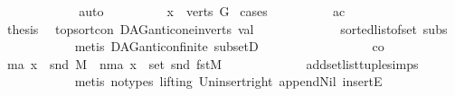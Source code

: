 \begin{isabellebody}
\ \ \ \ \ \ \ \ \isamarkupfalse%
\ {}\ \isamarkupfalse%
\ auto\isanewline
\ \ \ \ \ \ \isamarkupfalse%
\ \isamarkupfalse%
\ {\isachardoublequoteopen}x\ {\isasymin}\ verts\ G{\isachardoublequoteclose}\ \isamarkupfalse%
{\isacharparenleft}{\kern0pt}cases{\isacharparenright}{\kern0pt}\isanewline
\ \ \ \ \ \ \ \ \isamarkupfalse%
\ ac\isanewline
\ \ \ \ \ \ \ \ \isamarkupfalse%
\ \isamarkupfalse%
\ {\isacharquery}{\kern0pt}thesis\ \isamarkupfalse%
\ top{\isacharunderscore}{\kern0pt}sort{\isacharunderscore}{\kern0pt}con\ DAG{\isachardot}{\kern0pt}anticone{\isacharunderscore}{\kern0pt}in{\isacharunderscore}{\kern0pt}verts\ val\ \isanewline
\ \ \ \ \ \ \ \ \ \ \ \ sorted{\isacharunderscore}{\kern0pt}list{\isacharunderscore}{\kern0pt}of{\isacharunderscore}{\kern0pt}set{\isacharparenleft}{\kern0pt}{}{\isacharparenright}{\kern0pt}\ subs{\isacharparenleft}{\kern0pt}{}{\isacharparenright}{\kern0pt}\isanewline
\ \ \ \ \ \ \ \ \ \ \isamarkupfalse%
\ {\isacharparenleft}{\kern0pt}metis\ DAG{\isachardot}{\kern0pt}anticon{\isacharunderscore}{\kern0pt}finite\ subsetD{\isacharparenright}{\kern0pt}\ \isanewline
\ \ \ \ \ \ \isamarkupfalse%
\isanewline
\ \ \ \ \ \ \ \ \isamarkupfalse%
\ co\isanewline
\ \ \ \ \ \ \ \ \isamarkupfalse%
\ \isamarkupfalse%
\ {\isacharparenleft}{\kern0pt}ma{\isacharparenright}{\kern0pt}\ {\isachardoublequoteopen}x\ {\isacharequal}{\kern0pt}\ snd\ M{\isachardoublequoteclose}\ {\isacharbar}{\kern0pt}\ {\isacharparenleft}{\kern0pt}nma{\isacharparenright}{\kern0pt}\ {\isachardoublequoteopen}x\ {\isasymin}\ set\ {\isacharparenleft}{\kern0pt}snd{\isacharparenleft}{\kern0pt}\ fst{\isacharparenleft}{\kern0pt}M{\isacharparenright}{\kern0pt}{\isacharparenright}{\kern0pt}{\isacharparenright}{\kern0pt}{\isachardoublequoteclose}\ \isanewline
\ \ \ \ \ \ \ \ \ \ \isamarkupfalse%
\ add{\isacharunderscore}{\kern0pt}set{\isacharunderscore}{\kern0pt}list{\isacharunderscore}{\kern0pt}tuple{\isachardot}{\kern0pt}simps\isanewline
\ \ \ \ \ \ \ \ \ \ \isamarkupfalse%
\ {\isacharparenleft}{\kern0pt}metis\ {\isacharparenleft}{\kern0pt}no{\isacharunderscore}{\kern0pt}types{\isacharcomma}{\kern0pt}\ lifting{\isacharparenright}{\kern0pt}\ Un{\isacharunderscore}{\kern0pt}insert{\isacharunderscore}{\kern0pt}right\ append{\isacharunderscore}{\kern0pt}Nil{}\ insertE\isanewline

\end{isabellebody}
